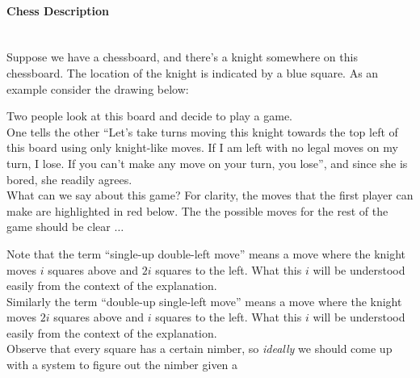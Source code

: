 \documentclass{article}
\newcommand{\SUDL}{single-up double-left}
\newcommand{\DUSL}{double-up single-left}
\begin{document}
\paragraph{Chess Description}\mbox{}\\
Suppose we have a chessboard, and there's a knight somewhere on this
chessboard. The location of the knight is indicated by a blue square.
As an example consider the drawing below: \\
\begin{center}
\end{center}
Two people look at this board and decide to play a game. \\
One tells the other ``Let's take turns moving this knight towards the top left
of this board using only knight-like moves. If I am left with no
legal moves on my turn, I lose. If you can't make any move on your
turn, you lose'', and since she is bored, she readily agrees. \\
What can we say about this game? For clarity, the moves that the first
player can make are highlighted in red below. The the possible moves
for the rest of the game should be clear $\ldots$
\begin{center}
\end{center}
Note that the term ``\SUDL{} move'' means a move where the knight moves
$i$ squares above and $2i$ squares to the left. What this $i$ will
be understood easily from the context of the explanation. \\
Similarly the term ``\DUSL{} move'' means a move where the knight moves
$2i$ squares above and $i$ squares to the left. What this $i$ will
be understood easily from the context of the explanation. \\
Observe that every square has a certain nimber, so \textit{ideally} we
should come up with a system to figure out the nimber given a
\end{document}
